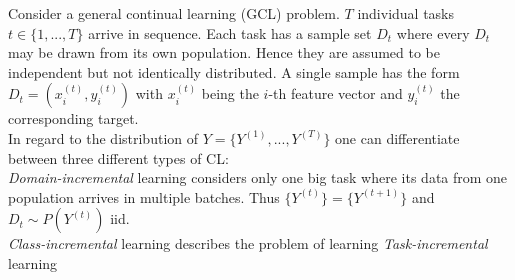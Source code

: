 Consider a general continual learning (GCL) problem. $T$ individual tasks $t \in \{1, ..., T\}$ arrive in sequence. Each task has a sample set $D_t$ where every $D_t$ may be drawn from its own population. Hence they are assumed to be independent but not identically distributed. A single sample has the form $D_t = (x^{(t)}_i,y^{(t)}_i)$ with $x^{(t)}_i$ being the $i$-th feature vector and $y^{(t)}_i$ the corresponding target.\\
In regard to the distribution of $Y = \{Y^{(1)}, ..., Y^{(T)}\}$ one can differentiate between three different types of CL:\\
\textit{Domain-incremental} learning considers only one big task where its data from one population arrives in multiple batches. Thus $\{Y^{(t)}\}=\{Y^{(t+1)}\}$ and $D_t \sim P(Y^{(t)})$ iid.\\
\textit{Class-incremental} learning describes the problem of learning 
\textit{Task-incremental} learning
